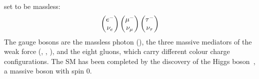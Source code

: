 set to be massless:
\begin{align}
\begin{pmatrix}
{\ensuremath{e^-}} \\ {{\nu}_e}
\end{pmatrix}
\begin{pmatrix}
{\ensuremath{\mu^-}} \\ {{\nu}_\mu}
\end{pmatrix}
\begin{pmatrix}
{\ensuremath{\tau^-}} \\ {{\nu}_\tau}
\end{pmatrix}
\end{align}
The gauge bosons are the massless photon (\g), the three massive mediators of
the weak force (\Wp, \Wm, \Z), and the eight gluons, which carry different
colour charge configurations. The SM has been completed by the discovery of
the Higgs boson~\cite{Higgs-Atlas,Higgs-CMS}, a massive boson with spin 0.

